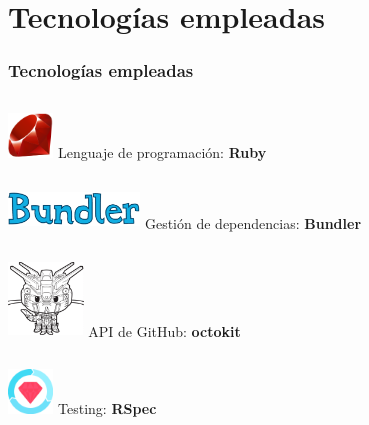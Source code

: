 \documentclass{beamer}
\begin{document}
\section{Tecnologías empleadas}
\begin{frame}[fragile]
  \frametitle{Tecnologías empleadas}
  \begin{columns}
       \centering
       \includegraphics[height=1.2cm, width=1.2cm]{img/ruby-logo.png}
        Lenguaje de programación: \textbf{Ruby}
  \end{columns}
  \bigskip

  \begin{columns}
       \centering
       \includegraphics[height=1cm, width=3.5cm]{img/bundler-logo.png}
        Gestión de dependencias: \textbf{Bundler}
  \end{columns}
  \bigskip

  \begin{columns}
       \centering
       \includegraphics[height=2cm, width=2cm]{img/octokit-logo.png}
        API de GitHub: \textbf{octokit}
  \end{columns}
  \bigskip

  \begin{columns}
       \centering
       \includegraphics[height=1.2cm, width=1.2cm]{img/rspec-logo.png}
        Testing: \textbf{RSpec}
  \end{columns}
\end{frame}
\end{document}
